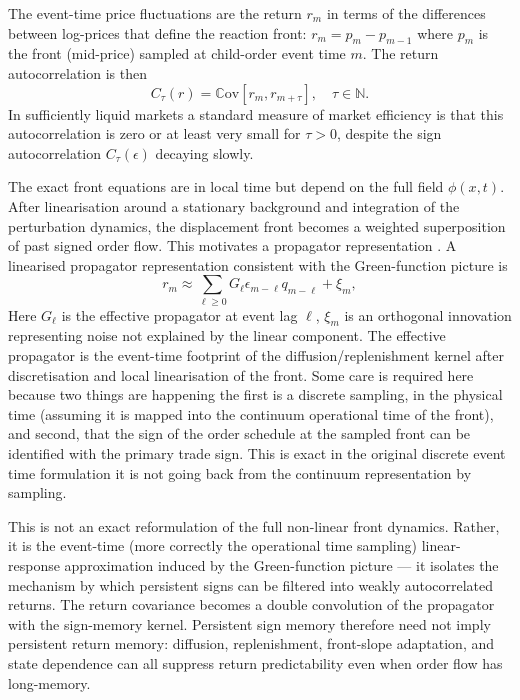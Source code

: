 \documentclass[5p,final]{elsarticle}
\newcommand{\Cov}{\mathbb{C}\mathrm{ov}}
\newcommand{\N}{\mathbb{N}}
\begin{document}

The event-time price fluctuations are the return $r_m$ in terms of the differences between log-prices that define the reaction front: $r_m = p_m - p_{m-1}$ where $p_m$ is the front (mid-price) sampled at child-order event time $m$. The return autocorrelation is then
\begin{equation}
    C_\tau(r) = \Cov[r_m,r_{m+\tau}], \quad \tau \in \N. \label{eq:returncov}
\end{equation}
In sufficiently liquid markets a standard measure of market efficiency is that this autocorrelation is zero or at least very small for $\tau>0$, despite the sign autocorrelation $C_\tau(\epsilon)$ decaying slowly. 

The exact front equations are in local time but depend on the full field $\phi(x,t)$. After linearisation around a stationary background and integration of the perturbation dynamics, the displacement front becomes a weighted superposition of past signed order flow. This motivates a propagator representation \cite{bouchaud2018tqp}. A linearised propagator representation consistent with the Green-function picture is
\begin{equation}
    r_m\approx \sum_{\ell\ge 0}G_\ell\epsilon_{m-\ell} q_{m-\ell}+\xi_m, \label{eq:returnprop}
\end{equation}
Here $G_{\ell}$ is the effective propagator at event lag $\ell$, $\xi_m$ is an orthogonal innovation representing noise not explained by the linear component. The effective propagator is the event-time footprint of the diffusion/replenishment kernel after discretisation and local linearisation of the front. Some care is required here because two things are happening the first is a discrete sampling, in the physical time (assuming it is mapped into the continuum operational time of the front), and second, that the sign of the order schedule at the sampled front can be identified with the primary trade sign. This is exact in the original discrete event time formulation it is not going back from the continuum representation by sampling.  

This is not an exact reformulation of the full non-linear front dynamics. Rather, it is the event-time (more correctly the operational time sampling) linear-response approximation induced by the Green-function picture --- it isolates the mechanism by which persistent signs can be filtered into weakly autocorrelated returns. The return covariance becomes a double convolution of the propagator with the sign-memory kernel. Persistent sign memory therefore need not imply persistent return memory: diffusion, replenishment, front-slope adaptation, and state dependence can all suppress return predictability even when order flow has long-memory. 
\end{document}
